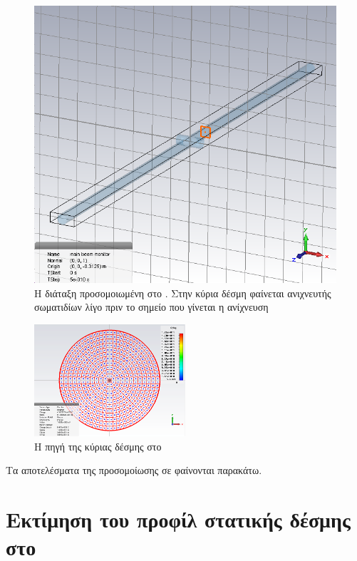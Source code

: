 \begin{figure}[tbh]
\includegraphics[width=\textwidth]{figures/CST-pic-monitor}
\centering
\caption[Η διάταξη προσομοιωμένη στο ]{Η διάταξη προσομοιωμένη στο . 
Στην κύρια δέσμη φαίνεται ανιχνευτής σωματιδίων λίγο πριν το σημείο που γίνεται η ανίχνευση}
\label{fig:CST-PICmonitor}
\end{figure}

\begin{figure}[tbh]
\includegraphics[width=0.5\textwidth]{figures/CST-main-beam-source}
\centering
\caption{Η πηγή της κύριας δέσμης στο }
\label{fig:CST-mainBeamSource}
\end{figure}

Τα αποτελέσματα της προσομοίωσης σε φαίνονται παρακάτω. 


\section{Εκτίμηση του προφίλ στατικής δέσμης στο }

